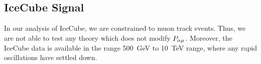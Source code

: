 
\subsection{IceCube Signal}
In our analysis of IceCube, we are constrained to muon track events. Thus, we are not able to test any theory which does not modify $P_{\alpha \mu}$. Moreover,
the IceCube data is available in the range \SI{500}{\GeV} to \SI{10}{\TeV} range, where any rapid oscillations have settled down.

